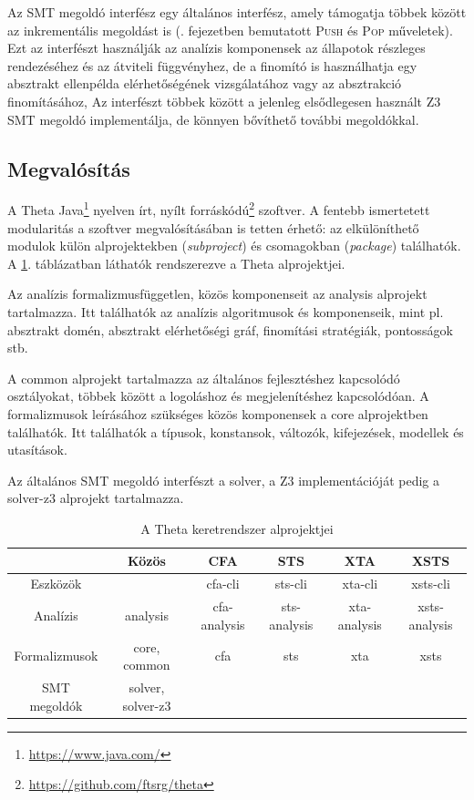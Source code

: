 Az SMT megoldó interfész egy általános interfész, amely támogatja többek között az inkrementális megoldást is (. fejezetben bemutatott \textsc{Push} és \textsc{Pop} műveletek). Ezt az interfészt használják az analízis komponensek az állapotok részleges rendezéséhez és az átviteli függvényhez, de a finomító is használhatja egy absztrakt ellenpélda elérhetőségének vizsgálatához vagy az absztrakció finomításához, Az interfészt többek között a jelenleg elsődlegesen használt Z3 SMT megoldó implementálja, de könnyen bővíthető további megoldókkal.

\subsection{Megvalósítás}

A Theta Java\footnote{\url{https://www.java.com/}} nyelven írt, nyílt forráskódú\footnote{\url{https://github.com/ftsrg/theta}} szoftver. A fentebb ismertetett modularitás a szoftver megvalósításában is tetten érhető: az elkülöníthető modulok külön alprojektekben (\emph{subproject}) és csomagokban (\emph{package}) találhatók. A \ref{table:theta-packages}. táblázatban láthatók rendszerezve a Theta alprojektjei.

Az analízis formalizmusfüggetlen, közös komponenseit az \textsf{analysis} alprojekt tartalmazza. Itt találhatók az analízis algoritmusok és komponenseik, mint pl. absztrakt domén, absztrakt elérhetőségi gráf, finomítási stratégiák, pontosságok stb.

A \textsf{common} alprojekt tartalmazza az általános fejlesztéshez kapcsolódó osztályokat, többek között a logoláshoz és megjelenítéshez kapcsolódóan. A formalizmusok leírásához szükséges közös komponensek a \textsf{core} alprojektben találhatók. Itt találhatók a típusok, konstansok, változók, kifejezések, modellek és utasítások.

Az általános SMT megoldó interfészt a \textsf{solver}, a Z3 implementációját pedig a \textsf{solver-z3} alprojekt tartalmazza.

\begin{table}
\centering
\begin{tabular}{ |c||c|c|c|c|c| } 
 \hline
  & Közös & CFA & STS & XTA & XSTS \\ 
 \hline
 \hline
 Eszközök & & \textsf{cfa-cli} & \textsf{sts-cli} & \textsf{xta-cli} & \textsf{xsts-cli} \\ 
 \hline
 Analízis & \textsf{analysis} & \textsf{cfa-analysis} & \textsf{sts-analysis} & \textsf{xta-analysis} & \textsf{xsts-analysis} \\ 
 \hline
 Formalizmusok & \textsf{core}, \textsf{common} & \textsf{cfa} & \textsf{sts} & \textsf{xta} & \textsf{xsts} \\ 
 \hline
 SMT megoldók & \textsf{solver}, \textsf{solver-z3} & & & & \\
 \hline
\end{tabular}
\caption{A Theta keretrendszer alprojektjei}
\label{table:theta-packages}
\end{table}

